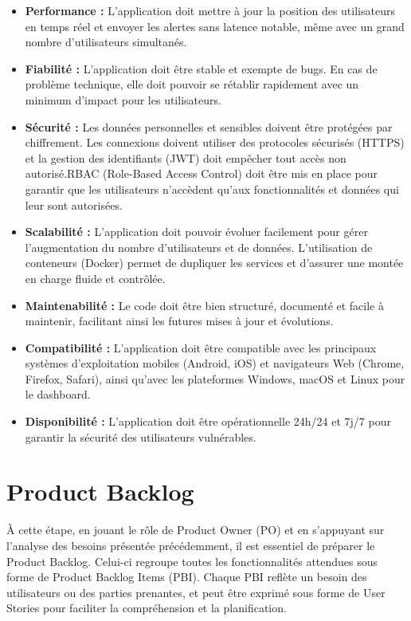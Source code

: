 \begin{itemize}
    \item \textbf{Performance :} L'application doit mettre à jour la position des utilisateurs en temps réel et envoyer les alertes sans latence notable, même avec un grand nombre d'utilisateurs simultanés.
    
    \item \textbf{Fiabilité :} L'application doit être stable et exempte de bugs. En cas de problème technique, elle doit pouvoir se rétablir rapidement avec un minimum d'impact pour les utilisateurs.
    
    \item \textbf{Sécurité :} Les données personnelles et sensibles doivent être protégées par chiffrement. Les connexions doivent utiliser des protocoles sécurisés (HTTPS) et la gestion des identifiants (JWT) doit empêcher tout accès non autorisé.RBAC (Role-Based Access Control) doit être mis en place pour garantir que les utilisateurs n'accèdent qu'aux fonctionnalités et données qui leur sont autorisées.
    
    \item \textbf{Scalabilité :} L'application doit pouvoir évoluer facilement pour gérer l'augmentation du nombre d'utilisateurs et de données. L'utilisation de conteneurs (Docker) permet de dupliquer les services et d'assurer une montée en charge fluide et contrôlée.
    
    \item \textbf{Maintenabilité :} Le code doit être bien structuré, documenté et facile à maintenir, facilitant ainsi les futures mises à jour et évolutions.
    
    \item \textbf{Compatibilité :} L'application doit être compatible avec les principaux systèmes d'exploitation mobiles (Android, iOS) et navigateurs Web (Chrome, Firefox, Safari), ainsi qu'avec les plateformes Windows, macOS et Linux pour le dashboard.
    
    \item \textbf{Disponibilité :} L'application doit être opérationnelle 24h/24 et 7j/7 pour garantir la sécurité des utilisateurs vulnérables.
\end{itemize}

\section{Product Backlog}
À cette étape, en jouant le rôle de Product Owner (PO) et en s'appuyant sur l'analyse des besoins présentée précédemment, il est essentiel de préparer le Product Backlog. Celui-ci regroupe toutes les fonctionnalités attendues sous forme de Product Backlog Items (PBI). Chaque PBI reflète un besoin des utilisateurs ou des parties prenantes, et peut être exprimé sous forme de User Stories pour faciliter la compréhension et la planification.

